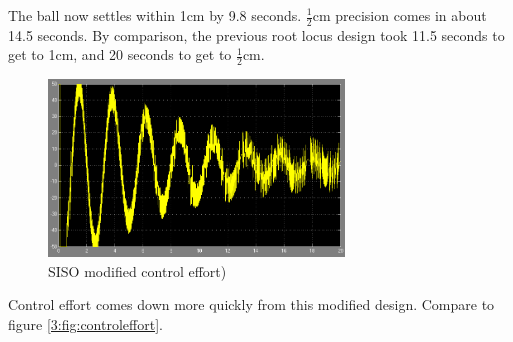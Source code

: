 The ball now settles within 1cm by 9.8 seconds. $\frac{1}{2}$cm precision comes in about 14.5 seconds. By comparison, the previous root locus design took 11.5 seconds to get to 1cm, and 20 seconds to get to $\frac{1}{2}$cm.

\begin{figure}[h]
	\centering
		\includegraphics[width=0.70\textwidth]{pics/sisoce}
	\caption{SISO modified control effort)}
	\label{3:fig:sisoce}
\end{figure}

Control effort comes down more quickly from this modified design. Compare to figure \ref{3:fig:controleffort}.